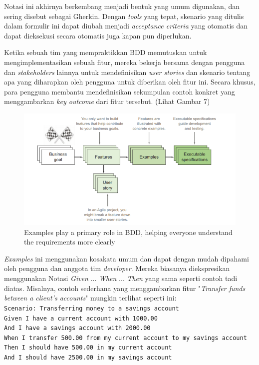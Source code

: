 \documentclass[a4paper,twoside]{article}
\begin{document}
\begin{enumerate}
Notasi ini akhirnya berkembang menjadi bentuk yang umum digunakan, dan sering disebut sebagai Gherkin. Dengan \textit{tools} yang tepat, skenario yang ditulis dalam formulir ini dapat diubah menjadi \textit{acceptance criteria} yang otomatis dan dapat dieksekusi secara otomatis juga kapan pun diperlukan. 

Ketika sebuah tim yang mempraktikkan BDD memutuskan untuk mengimplementasikan sebuah fitur, mereka bekerja bersama dengan pengguna dan \textit{stakeholders} lainnya untuk mendefinisikan \textit{user stories} dan skenario tentang apa yang diharapkan oleh pengguna untuk diberikan oleh fitur ini. Secara khusus, para pengguna membantu mendefinisikan sekumpulan contoh konkret yang menggambarkan \textit{key outcome} dari fitur tersebut. (Lihat Gambar 7)
\begin{figure}
	\includegraphics[scale=1.2]{../DokumenSkripsi/gambar/skenario}
	\centering
	\caption{Examples play a primary role in BDD, helping everyone understand the
requirements more clearly}
\end{figure}

\textit{Examples} ini menggunakan kosakata umum dan dapat dengan mudah dipahami oleh pengguna dan anggota tim \textit{developer}. Mereka biasanya diekspresikan menggunakan Notasi \textit{Given} ... \textit{When} ... \textit{Then} yang sama seperti contoh tadi diatas. Misalnya, contoh sederhana yang menggambarkan fitur "\textit{Transfer funds between a client’s accounts}" mungkin terlihat seperti ini:\\
\texttt{Scenario: Transferring money to a savings account\\
 Given I have a current account with 1000.00\\
 And I have a savings account with 2000.00\\
 When I transfer 500.00 from my current account to my savings account\\
 Then I should have 500.00 in my current account\\
 And I should have 2500.00 in my savings account\\}
 

\end{enumerate}
\end{document}
